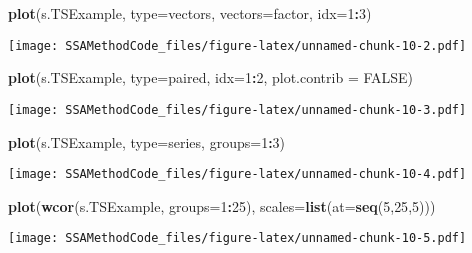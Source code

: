 \documentclass[
]{article}
\newenvironment{Shaded}{\begin{snugshade}}{\end{snugshade}}
\newcommand{\AttributeTok}[1]{\textcolor[rgb]{0.13,0.29,0.53}{#1}}
\newcommand{\ConstantTok}[1]{\textcolor[rgb]{0.56,0.35,0.01}{#1}}
\newcommand{\DecValTok}[1]{\textcolor[rgb]{0.00,0.00,0.81}{#1}}
\newcommand{\FunctionTok}[1]{\textcolor[rgb]{0.13,0.29,0.53}{\textbf{#1}}}
\newcommand{\NormalTok}[1]{#1}
\newcommand{\SpecialCharTok}[1]{\textcolor[rgb]{0.81,0.36,0.00}{\textbf{#1}}}
\newcommand{\StringTok}[1]{\textcolor[rgb]{0.31,0.60,0.02}{#1}}
\begin{document}
\begin{Shaded}
\begin{Highlighting}[]
\FunctionTok{plot}\NormalTok{(s.TSExample, }\AttributeTok{type=}\StringTok{\textquotesingle{}vectors\textquotesingle{}}\NormalTok{, }\AttributeTok{vectors=}\StringTok{\textquotesingle{}factor\textquotesingle{}}\NormalTok{, }\AttributeTok{idx=}\DecValTok{1}\SpecialCharTok{:}\DecValTok{3}\NormalTok{)}
\end{Highlighting}
\end{Shaded}

\texttt{[image: SSAMethodCode\_files/figure-latex/unnamed-chunk-10-2.pdf]}

\begin{Shaded}
\begin{Highlighting}[]
\FunctionTok{plot}\NormalTok{(s.TSExample, }\AttributeTok{type=}\StringTok{\textquotesingle{}paired\textquotesingle{}}\NormalTok{, }\AttributeTok{idx=}\DecValTok{1}\SpecialCharTok{:}\DecValTok{2}\NormalTok{, }\AttributeTok{plot.contrib =} \ConstantTok{FALSE}\NormalTok{)}
\end{Highlighting}
\end{Shaded}

\texttt{[image: SSAMethodCode\_files/figure-latex/unnamed-chunk-10-3.pdf]}

\begin{Shaded}
\begin{Highlighting}[]
\FunctionTok{plot}\NormalTok{(s.TSExample, }\AttributeTok{type=}\StringTok{\textquotesingle{}series\textquotesingle{}}\NormalTok{, }\AttributeTok{groups=}\DecValTok{1}\SpecialCharTok{:}\DecValTok{3}\NormalTok{)}
\end{Highlighting}
\end{Shaded}

\texttt{[image: SSAMethodCode\_files/figure-latex/unnamed-chunk-10-4.pdf]}

\begin{Shaded}
\begin{Highlighting}[]
\FunctionTok{plot}\NormalTok{(}\FunctionTok{wcor}\NormalTok{(s.TSExample, }\AttributeTok{groups=}\DecValTok{1}\SpecialCharTok{:}\DecValTok{25}\NormalTok{), }\AttributeTok{scales=}\FunctionTok{list}\NormalTok{(}\AttributeTok{at=}\FunctionTok{seq}\NormalTok{(}\DecValTok{5}\NormalTok{,}\DecValTok{25}\NormalTok{,}\DecValTok{5}\NormalTok{)))}
\end{Highlighting}
\end{Shaded}

\texttt{[image: SSAMethodCode\_files/figure-latex/unnamed-chunk-10-5.pdf]}
\end{document}

